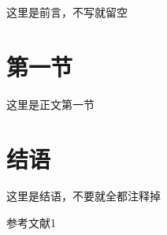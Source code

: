 \documentclass[a4paper,12pt]{ctexart}
\newcommand{\upcite}[1]{\textsuperscript{\cite{#1}}} %
\begin{document}
\maketitle %

这里是前言，不写就留空

\section{第一节}
这里是正文第一节

\section*{结语}
这里是结语，不要就全都注释掉\upcite{m1}

\renewcommand{\refname}{参考文献}
\begin{thebibliography}{99}
	 参考文献1
\end{thebibliography}
\end{document}
